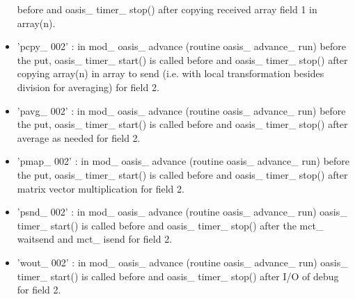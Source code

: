 \begin{itemize}
before and oasis\_ timer\_ stop() after copying received array field 1 in array(n).
\item {'pcpy\_ 002'} : in mod\_ oasis\_ advance (routine oasis\_ advance\_ run) before the put, oasis\_ timer\_ start() is called 
before and oasis\_ timer\_ stop()  after copying array(n) in array to send (i.e. with local transformation besides division 
for averaging) for field 2.
\item {'pavg\_ 002'} :  in mod\_ oasis\_ advance (routine oasis\_ advance\_ run) before the put,  oasis\_ timer\_ start() is called 
before and oasis\_ timer\_ stop() after average as needed for field 2.
\item {'pmap\_ 002'} :  in mod\_ oasis\_ advance (routine oasis\_ advance\_ run) before the put, oasis\_ timer\_ start() is called 
before and oasis\_ timer\_ stop() after matrix vector multiplication for field 2.
\item {'psnd\_ 002'} : in mod\_ oasis\_ advance (routine oasis\_ advance\_ run) oasis\_ timer\_ start() is called before and 
oasis\_ timer\_ stop() after the mct\_ waitsend and mct\_ isend for field 2.
\item {'wout\_ 002'} : in mod\_ oasis\_ advance (routine oasis\_ advance\_ run) oasis\_ timer\_ start() is called before and 
oasis\_ timer\_ stop() after  I/O of debug for field 2. 
\end{itemize}

